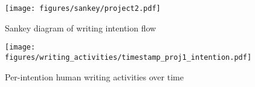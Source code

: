 \begin{figure*}[ht]
    \centering
    \begin{subfigure}[b]{0.4\textwidth}
        \centering
        \texttt{[image: figures/sankey/project2.pdf]}
        \caption{Sankey diagram of writing intention flow}
        \label{fig:sankey-proj2}
    \end{subfigure}
    \vspace{2mm}
    \begin{subfigure}[b]{0.43\textwidth}
        \centering
        \texttt{[image: figures/writing\_activities/timestamp\_proj1\_intention.pdf]}
        \caption{Per-intention human writing activities over time}
         \label{fig:writing-activity-per-intention}
    \end{subfigure}
    

\end{figure*}
